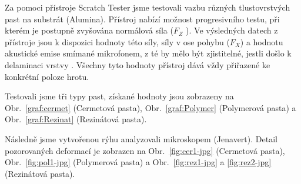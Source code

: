 Za pomoci přístroje Scratch Tester jsme testovali vazbu různých tlustovrstvých past na substrát (Alumina). Přístroj nabízí možnost progresivního testu, při kterém je postupně zvyšována normálová síla (\(F_{Z} \) ). Ve výsledných datech z přístroje jsou k dispozici hodnoty této síly, síly v ose pohybu (\(F_{X} \)) a hodnotu akustické emise smímané mikrofonem, z té by mělo být zjistitelné, jestli došlo k delaminaci vrstvy \cite{DiplomkaScratchTester}. Všechny tyto hodnoty přístroj dává vždy přiřazené ke konkrétní poloze hrotu. 

Testovali jsme tři typy past, získané hodnoty jsou zobrazeny na Obr.~\ref{graf:cermet} (Cermetová pasta), Obr.~\ref{graf:Polymer} (Polymerová pasta) a Obr.~\ref{graf:Rezinat} (Rezinátová pasta).

Následně jsme vytvořenou rýhu analyzovali mikroskopem (Jenavert). Detail pozorovaných deformací je zobrazen na Obr.~\ref{fig:cer1-jpg} (Cermetová pasta), Obr.~\ref{fig:pol1-jpg} (Polymerová pasta) a Obr.~\ref{fig:rez1-jpg} a \ref{fig:rez2-jpg} (Rezinátová pasta).

\begin{figure*}[h!]
    \caption{Scratch test -- Cermet.}
    \label{graf:cermet}
\end{figure*}

